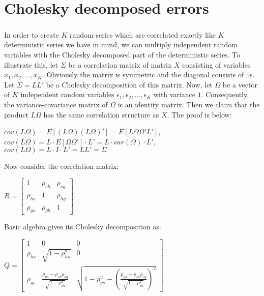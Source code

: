 \chapter{Cholesky decomposed errors}
\label{appa}

\paragraph*{}In order to create $K$ random series which are correlated exactly like $K$ deterministic series we have in mind, we can multiply independent random variables with the Cholesky decomposed part of the deterministic series. To illustrate this, let $\Sigma$ be a correlation matrix of matrix $X$ consisting of variables $x_1, x_2, ..., x_K$. Obviously the matrix is symmetric and the diagonal consists of $1$s. Let $\Sigma = LL'$ be a Cholesky decomposition of this matrix. Now, let $\Omega$ be a vector of $K$ independent random variables $\epsilon_1, \epsilon_2, ..., \epsilon_K$ with variance $1$. Consequently, the variance-covariance matrix of $\Omega$ is an identity matrix. Then we claim that the product $L\Omega$ has the same correlation structure as $X$. The proof is below:

\begin{center}
  $cov(L\Omega) = E[(L\Omega)(L\Omega)'] = E[L\Omega\Omega'L']$,\\
  $cov(L\Omega) = L \cdot E[\Omega\Omega'] \cdot L' = L \cdot var(\Omega) \cdot L'$,\\
  $cov(L\Omega) = L\cdot I \cdot L' = LL' = \Sigma$
\end{center}

Now consider the correlation matrix:

\begin{center}
	$R = \begin{bmatrix}
					1 & \rho_{sh} & \rho_{sy} \\
					\rho_{hs} & 1 & \rho_{hy} \\
					\rho_{ys} & \rho_{yh} & 1
			\end{bmatrix}
	$
\end{center}

Basic algebra gives its Cholesky decomposition as:

\begin{center}
	$Q = \begin{bmatrix}
					1 & 0 & 0 \\
					\rho_{hs} & \sqrt{1-\rho^2_{hs}} & 0 \\
					\rho_{ys} & \frac{\rho_{yh} - \rho_{sh}\rho_{sy}}{\sqrt{1-\rho^2_{sh}}} & \sqrt{1-\rho^2_{ys}-(\frac{\rho_{yh} - \rho_{sh}\rho_{sy}}{\sqrt{1-\rho^2_{sh}}})^2}
			\end{bmatrix}
	$
\end{center}
